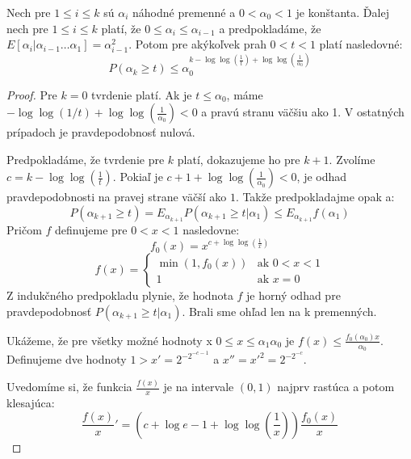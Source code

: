 \begin{lemma}
\label{lemma-random-variable}
Nech pre $1 \leq i \leq k$ sú $\alpha_i$ náhodné premenné a $0 < \alpha_0 < 1$ je konštanta. Ďalej nech pre $1 \leq i \leq k$ platí, že $0 \leq \alpha_i \leq \alpha_{i - 1}$ a predpokladáme, že $E[ \alpha_i | \alpha_{i-1} \dots \alpha_1 ] = \alpha_{i-1}^{2}$. Potom pre akýkoľvek prah $0 < t < 1$ platí nasledovné:
\begin{displaymath}
P(\alpha_k \geq t) \leq \alpha_0^{k - \log \log (\frac{1}{t}) + \log \log (\frac{1}{\alpha_0})}
\end{displaymath}
\end{lemma}
\begin{proof}
Pre $k = 0$ tvrdenie platí. Ak je $t \leq \alpha_0$, máme $-\log \log (1/t) + \log \log \left(\frac{1}{\alpha_0}\right) < 0$ a pravú stranu väčšiu ako 1. V ostatných prípadoch je pravdepodobnosť nulová.

Predpokladáme, že tvrdenie pre $k$ platí, dokazujeme ho pre $k + 1$. Zvolíme $c = k - \log \log \left(\frac{1}{t}\right)$. Pokiaľ je $c + 1 + \log \log \left(\frac{1}{\alpha_0}\right) < 0$, je odhad pravdepodobnosti na pravej strane väčší ako $1$. Takže predpokladajme opak a:
\begin{displaymath}
P(\alpha_{k+1} \geq t) = E_{\alpha_{k+1}} P(\alpha_{k+1} \geq t | \alpha_1) \leq E_{\alpha_{k+1}} f(\alpha_1)
\end{displaymath}
Pričom $f$ definujeme pre $0 < x < 1$ nasledovne:
\begin{displaymath}
f_0(x) = x ^ {c + \log \log \left(\frac{1}{x}\right)}
\end{displaymath}
\begin{displaymath}
 f(x) = 
  \begin{cases} 
   \min(1, f_0(x)) & \text{ak } 0 < x < 1 \\
   1 & \text{ak } x = 0
  \end{cases}
\end{displaymath}
Z indukčného predpokladu plynie, že hodnota $f$ je horný odhad pre pravdepodobnosť $P(\alpha_{k+1} \geq t | \alpha_1)$. Brali sme ohľad len na k premenných.

Ukážeme, že pre všetky možné hodnoty x $0 \leq x \leq \alpha_1 \alpha_0$ je $f(x) \leq \frac{f_0(\alpha_0)x}{\alpha_0}$. Definujeme dve hodnoty $1 > x' = 2 ^ {-2 ^ {-c - 1}}$ a $x'' = {x'}^2 = 2 ^ {-2 ^ {-c}}$. 

Uvedomíme si, že funkcia $\frac{f(x)}{x}$ je na intervale $(0, 1)$ najprv rastúca a potom klesajúca:
\begin{displaymath}
\frac{f(x)}{x}' = \left(c + \log e - 1 + \log \log \left(\frac{1}{x}\right)\right)\frac{f_0(x)}{x}
\end{displaymath}


\end{proof}
